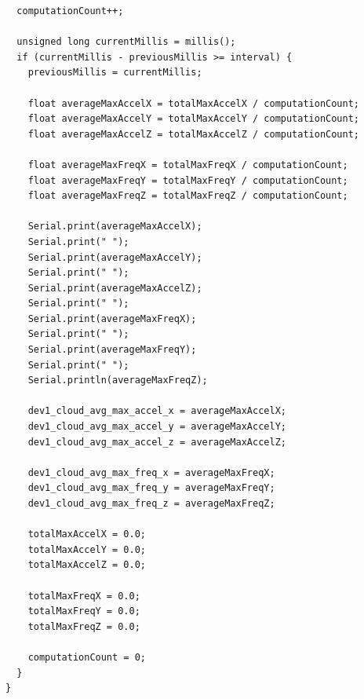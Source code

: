 \begin{verbatim}
  computationCount++;

  unsigned long currentMillis = millis();
  if (currentMillis - previousMillis >= interval) {
    previousMillis = currentMillis;

    float averageMaxAccelX = totalMaxAccelX / computationCount;
    float averageMaxAccelY = totalMaxAccelY / computationCount;
    float averageMaxAccelZ = totalMaxAccelZ / computationCount;

    float averageMaxFreqX = totalMaxFreqX / computationCount;
    float averageMaxFreqY = totalMaxFreqY / computationCount;
    float averageMaxFreqZ = totalMaxFreqZ / computationCount;

    Serial.print(averageMaxAccelX);
    Serial.print(" ");
    Serial.print(averageMaxAccelY);
    Serial.print(" ");
    Serial.print(averageMaxAccelZ);
    Serial.print(" ");
    Serial.print(averageMaxFreqX);
    Serial.print(" ");
    Serial.print(averageMaxFreqY);
    Serial.print(" ");
    Serial.println(averageMaxFreqZ);

    dev1_cloud_avg_max_accel_x = averageMaxAccelX;
    dev1_cloud_avg_max_accel_y = averageMaxAccelY;
    dev1_cloud_avg_max_accel_z = averageMaxAccelZ;

    dev1_cloud_avg_max_freq_x = averageMaxFreqX;
    dev1_cloud_avg_max_freq_y = averageMaxFreqY;
    dev1_cloud_avg_max_freq_z = averageMaxFreqZ;

    totalMaxAccelX = 0.0;
    totalMaxAccelY = 0.0;
    totalMaxAccelZ = 0.0;

    totalMaxFreqX = 0.0;
    totalMaxFreqY = 0.0;
    totalMaxFreqZ = 0.0;

    computationCount = 0;
  }
}
\end{verbatim}
